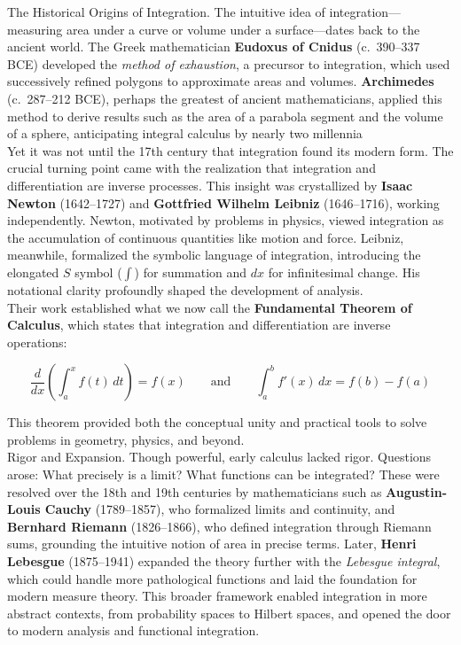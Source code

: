 \documentclass{book}
\begin{document}
The Historical Origins of Integration. The intuitive idea of integration—measuring area under a curve or volume under a surface—dates back to the ancient world. The Greek mathematician \textbf{Eudoxus of Cnidus} (c.~390--337 BCE) developed the \emph{method of exhaustion}, a precursor to integration, which used successively refined polygons to approximate areas and volumes. \textbf{Archimedes} (c.~287--212 BCE), perhaps the greatest of ancient mathematicians, applied this method to derive results such as the area of a parabola segment and the volume of a sphere, anticipating integral calculus by nearly two millennia\\

Yet it was not until the 17th century that integration found its modern form. The crucial turning point came with the realization that integration and differentiation are inverse processes. This insight was crystallized by \textbf{Isaac Newton} (1642--1727) and \textbf{Gottfried Wilhelm Leibniz} (1646--1716), working independently. Newton, motivated by problems in physics, viewed integration as the accumulation of continuous quantities like motion and force. Leibniz, meanwhile, formalized the symbolic language of integration, introducing the elongated $S$ symbol ($\int$) for summation and $dx$ for infinitesimal change. His notational clarity profoundly shaped the development of analysis.\\

Their work established what we now call the \textbf{Fundamental Theorem of Calculus}, which states that integration and differentiation are inverse operations:

\[
\frac{d}{dx} \left( \int_a^x f(t)\, dt \right) = f(x)
\qquad \text{and} \qquad
\int_a^b f'(x)\, dx = f(b) - f(a)
\]

This theorem provided both the conceptual unity and practical tools to solve problems in geometry, physics, and beyond.\\

Rigor and Expansion. Though powerful, early calculus lacked rigor. Questions arose: What precisely is a limit? What functions can be integrated? These were resolved over the 18th and 19th centuries by mathematicians such as \textbf{Augustin-Louis Cauchy} (1789--1857), who formalized limits and continuity, and \textbf{Bernhard Riemann} (1826--1866), who defined integration through Riemann sums, grounding the intuitive notion of area in precise terms. Later, \textbf{Henri Lebesgue} (1875--1941) expanded the theory further with the \emph{Lebesgue integral}, which could handle more pathological functions and laid the foundation for modern measure theory. This broader framework enabled integration in more abstract contexts, from probability spaces to Hilbert spaces, and opened the door to modern analysis and functional integration.\\
\end{document}
